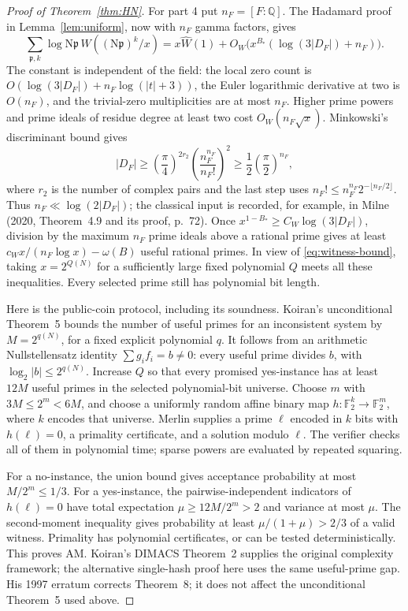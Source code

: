 \documentclass[11pt]{article}
\newcommand{\Q}{\mathbb Q}
\newcommand{\F}{\mathbb F}
\newcommand{\N}{\mathrm N}
\begin{document}
\begin{proof}[Proof of Theorem~\ref{thm:HN}]
For part 4 put $n_F=[F:\Q]$. The Hadamard proof in
Lemma~\ref{lem:uniform}, now with $n_F$ gamma factors, gives
\[
 \sum_{\mathfrak p,k}\log\N\mathfrak p\,
       W((\N\mathfrak p)^k/x)
 =x\widehat W(1)+
 O_W\bigl(x^{B_*}(\log(3|D_F|)+n_F)\bigr).                   \tag{3.2}
\]
The constant is independent of the field: the local zero count is
$O(\log(3|D_F|)+n_F\log(|t|+3))$, the Euler logarithmic derivative
at two is $O(n_F)$, and the trivial-zero multiplicities are at
most $n_F$. Higher prime powers and prime ideals of residue
degree at least two cost $O_W(n_F\sqrt x)$.
Minkowski's discriminant bound gives
\[
 |D_F|\ge
 \left(\frac{\pi}{4}\right)^{2r_2}
 \left(\frac{n_F^{n_F}}{n_F!}\right)^2
 \ge\frac12\left(\frac{\pi}{2}\right)^{n_F},
\]
where $r_2$ is the number of complex pairs and the last step uses
$n_F!\le n_F^{n_F}2^{-\lfloor n_F/2\rfloor}$.
Thus $n_F\ll\log(2|D_F|)$; the classical input is recorded,
for example, in Milne (2020, Theorem~4.9 and its proof, p.~72).
Once $x^{1-B_*}\ge C_W\log(3|D_F|)$, division by the maximum
$n_F$ prime ideals above a rational prime gives at least
$c_Wx/(n_F\log x)-\omega(B)$ useful rational primes.
In view of \eqref{eq:witness-bound}, taking $x=2^{Q(N)}$ for a sufficiently large
fixed polynomial $Q$ meets all these inequalities.
Every selected prime still has polynomial bit length.

Here is the public-coin protocol, including its soundness.
Koiran's unconditional Theorem~5 bounds the number of useful
primes for an inconsistent system by $M=2^{q(N)}$, for a fixed
explicit polynomial $q$. It follows from an arithmetic
Nullstellensatz identity $\sum g_i f_i=b\ne0$:
every useful prime divides $b$, with $\log_2|b|\le2^{q(N)}$.
Increase $Q$ so that every promised yes-instance has at least
$12M$ useful primes in the selected polynomial-bit universe.
Choose $m$ with $3M\le2^m<6M$, and choose a uniformly random
affine binary map $h:\F_2^k\to\F_2^m$, where $k$ encodes that universe.
Merlin supplies a prime $\ell$ encoded in $k$ bits with $h(\ell)=0$, a primality
certificate, and a solution modulo $\ell$. The verifier checks
all of them in polynomial time; sparse powers are evaluated by
repeated squaring.

For a no-instance, the union bound gives acceptance probability
at most $M/2^m\le1/3$. For a yes-instance, the pairwise-independent
indicators of $h(\ell)=0$ have total expectation
$\mu\ge12M/2^m>2$ and variance at most $\mu$.
The second-moment inequality gives probability at least
$\mu/(1+\mu)>2/3$ of a valid witness.
Primality has polynomial certificates, or can be tested
deterministically. This proves AM.
Koiran's DIMACS Theorem~2 supplies the original complexity
framework; the alternative single-hash proof here uses the
same useful-prime gap. His 1997 erratum corrects Theorem~8;
it does not affect the unconditional Theorem~5 used above.
\end{proof}
\end{document}
